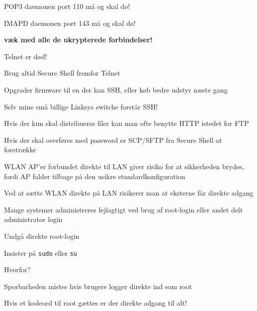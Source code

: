 \documentclass[Screen16to9,17pt]{foils}
\begin{document}
\pause
\centerline{\hlkbig POP3 daemonen port 110 må og skal dø!}

\pause
\centerline{\hlkbig IMAPD daemonen port 143 må og skal dø!}

\pause
\vskip 1cm
\centerline{\hlkbig\bf væk med alle de ukrypterede forbindelser!}


\begin{list1}
\item Telnet er død!
\item Brug altid Secure Shell fremfor Telnet
\item Opgrader firmware til en der kan SSH, eller køb bedre udstyr næste gang
\item Selv mine små billige Linksys switche forstår SSH!
\end{list1}


\begin{list1}
\item Hvis der kun skal distribueres filer kan man ofte benytte HTTP istedet for FTP
\item Hvis der skal overføres med password er SCP/SFTP fra Secure Shell at foretrække
\end{list1}




\begin{list1}
\item WLAN AP'er forbundet direkte til LAN giver risiko for at sikkerheden brydes, fordi AP falder tilbage på den usikre standardkonfiguration
\item Ved at sætte WLAN direkte på LAN risikerer man at eksterne får direkte adgang
\end{list1}




\begin{list1}
\item Mange systemer administreres fejlagtigt ved brug af
  root-login eller andet delt administrator login
\item Undgå direkte root-login
\item Insister på \verb+sudo+ eller \verb+su+
\item Hvorfor?
\begin{list2}
\item Sporbarheden mistes hvis brugere logger direkte ind som root
\item Hvis et kodeord til root gættes er der direkte adgang til alt!
\end{list2}
\end{list1}
\end{document}
